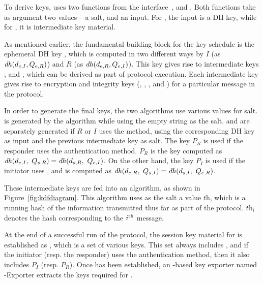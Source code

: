 To derive keys, \mEdhoc{} uses two functions from the \mHkdf{} interface~\cite{rfc5869}, \mHkdfExtract{} and \mHkdfExpand{}.
%
Both functions take as argument two values -- a salt, and an input. 
%
For \mHkdfExtract{}, the input is a DH key, while for \mHkdfExpand{}, it is intermediate key material.
%

As mentioned earlier, the fundamental building block for the key schedule is the ephemeral DH key \mGxy{}, which  is computed in two different ways by $I$ (as $\mathit{dh}(d_{e,I}, Q_{e,R})$) and $R$ (as $\mathit{dh}(d_{e,R}, Q_{e,I})$).
%
This key gives rise to intermediate keys \mPRKtwo{}, \mPRKthree{} and
\mPRKfour{}, which can be derived as part of protocol execution.
%
Each intermediate key gives rise to encryption and integrity keys (\mKtwoe, \mKtwom{}, \mKthreeae, and \mKthreem) for a particular message in the protocol.
%

In order to generate the final keys, the two \mHkdf{} algorithms use various values for salt.
%
\mPRKtwo{} is generated by the \mHkdfExtract{} algorithm while using the empty string as the salt.
%
\mPRKthree{} and \mPRKfour{} are separately generated if $R$ or $I$ uses the \mStat{} method, using the corresponding DH key as input and the previous intermediate key as salt.
%
The key $P_{R}$ is used if the responder uses the \mStat{} authentication method.
%
$P_{R}$ is the key computed as $\mathit{dh}(d_{e,I},\ Q_{s,R}{}) = \mathit{dh}(d_{s,R},\ Q_{e,I})$.
%
On the other hand, the key $P_{I}$ is used if the initiator uses \mStat{}, and is computed as $\mDH(\mY,\ \mGi{}) = \mDH(\mPriv{I},\ \mGy)$.

These intermediate keys are fed into an \mHkdfExpand{} algorithm, as shown in Figure~\ref{fig:kdfdiagram}. 
%
This algorithm uses as the salt a value $\textit{th}$, which is a running hash of the information transmitted thus far as part of the protocol.
%
$\textit{th}_{i}$ denotes the hash corresponding to the $i^{\rm{th}}$ message.

At the end of a successful run of the protocol, the session key material for \mOscore{} is established as \mSessKey{}, which is a set of various keys.
%
This set always includes \mGxy{}, and if the initiator (resp. the responder) uses the \mStat{} authentication method, then it also includes $P_{I}$ (resp. $P_{R}$).
%
Once \mSessKey{} has been established, an \mHkdf{}-based key exporter named \mEdhoc-Exporter extracts the keys required for \mOscore{}.
%

